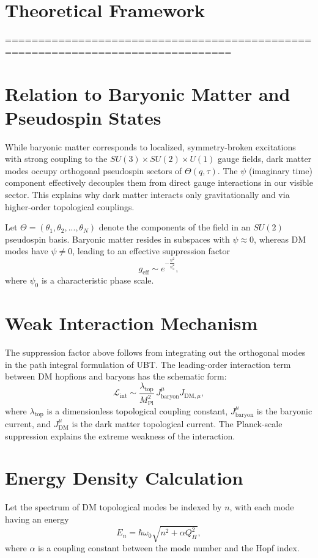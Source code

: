 \documentclass[12pt,a4paper]{article}
\numberwithin{equation}{section}
\theoremstyle{definition}
\theoremstyle{remark}
\begin{document}
\section{Theoretical Framework}
================================================================================

\section{Relation to Baryonic Matter and Pseudospin States}
While baryonic matter corresponds to localized, symmetry-broken excitations with strong coupling to the $SU(3) \times SU(2) \times U(1)$ gauge fields, dark matter modes occupy orthogonal pseudospin sectors of $\Theta(q,\tau)$.
The $\psi$ (imaginary time) component effectively decouples them from direct gauge interactions in our visible sector. This explains why dark matter interacts only gravitationally and via higher-order topological couplings.

Let $\Theta = (\theta_1, \theta_2, ..., \theta_N)$ denote the components of the field in an $SU(2)$ pseudospin basis. Baryonic matter resides in subspaces with $\psi \approx 0$, whereas DM modes have $\psi \neq 0$, leading to an effective suppression factor
\begin{equation}
g_{\mathrm{eff}} \sim e^{-\frac{\psi^2}{\psi_0^2}},
\end{equation}
where $\psi_0$ is a characteristic phase scale.

\section{Weak Interaction Mechanism}
The suppression factor above follows from integrating out the orthogonal modes in the path integral formulation of UBT. The leading-order interaction term between DM hopfions and baryons has the schematic form:
\begin{equation}
\mathcal{L}_{\mathrm{int}} \sim \frac{\lambda_{\mathrm{top}}}{M_{\mathrm{Pl}}^2} \, J_{\mathrm{baryon}}^\mu J_{\mathrm{DM},\mu},
\end{equation}
where $\lambda_{\mathrm{top}}$ is a dimensionless topological coupling constant, $J_{\mathrm{baryon}}^\mu$ is the baryonic current, and $J_{\mathrm{DM}}^\mu$ is the dark matter topological current. The Planck-scale suppression explains the extreme weakness of the interaction.

\section{Energy Density Calculation}
Let the spectrum of DM topological modes be indexed by $n$, with each mode having an energy
\begin{equation}
E_n = \hbar \omega_0 \sqrt{n^2 + \alpha Q_H^2},
\end{equation}
where $\alpha$ is a coupling constant between the mode number and the Hopf index.
\end{document}
